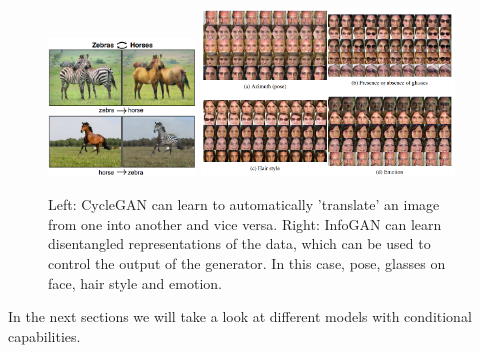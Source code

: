 \begin{figure}
    \centering
    \includegraphics[width=0.35\textwidth]{images/gan/cyclegan.png}
    \includegraphics[width=0.6\textwidth]{images/gan/infogan.png}
    \caption{Left: CycleGAN can learn to automatically 'translate' an image from one into another and vice versa. Right: InfoGAN can learn disentangled representations of the data, which can be used to control the output of the generator. In this case, pose, glasses on face, hair style and emotion.}
\end{figure}

In the next sections we will take a look at different models with conditional capabilities.